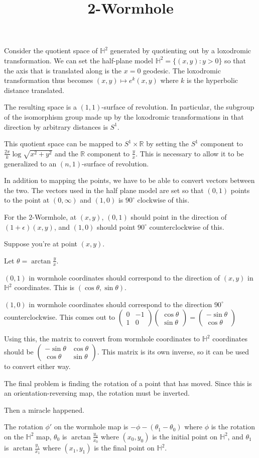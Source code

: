 \documentclass[12pt]{amsart}
\newcommand{\mat}[4]{\left(\begin{array}{ccc} #1 & #2 \\#3 & #4 \end{array} \right)}
\newcommand{\vect}[2]{\left(\begin{array}{ccc} #1 \\#2 \end{array} \right)}
\begin{document}
\title{2-Wormhole}
\maketitle

Consider the quotient space of $\mathbb{H}^2$ generated by quotienting out by a loxodromic transformation. We can set the half-plane model $\mathbb{H}^2 = \{(x,y):y>0\}$ so that the axis that is translated along is the $x=0$ geodesic. The loxodromic transformation thus becomes $(x,y) \mapsto e^k(x,y)$ where $k$ is the hyperbolic distance translated.

The resulting space is a $(1,1)$-surface of revolution. In particular, the subgroup of the isomorphism group made up by the loxodromic transformations in that direction by arbitrary distances is $S^1$.

This quotient space can be mapped to $S^1 \times \mathbb{R}$ by setting the $S^1$ component to $\frac{2\pi}{k}\log\sqrt{x^2+y^2}$ and the $\mathbb{R}$ component to $\frac{y}{x}$. This is necessary to allow it to be generalized to an $(n,1)$-surface of revolution.


In addition to mapping the points, we have to be able to convert vectors between the two. The vectors used in the half plane model are set so that $(0,1)$ points to the point at $(0,\infty)$ and $(1,0)$ is $90^\circ$ clockwise of this.

For the $2$-Wormhole, at $(x,y)$, $(0,1)$ should point in the direction of $(1+\epsilon)(x,y)$, and $(1,0)$ should point $90^\circ$ counterclockwise of this.

Suppose you're at point $(x,y)$.

Let $\theta = \arctan\frac{y}{x}$.

$(0,1)$ in wormhole coordinates should correspond to the direction of $(x,y)$ in $\mathbb{H}^2$ coordinates. This is $(\cos\theta,\sin\theta)$.

$(1,0)$ in wormhole coordinates should correspond to the direction $90^\circ$ counterclockwise. This comes out to $\mat{0}{-1}{1}{0}\vect{\cos\theta}{\sin\theta} = \vect{-\sin\theta}{\cos\theta}$

Using this, the matrix to convert from wormhole coordinates to $\mathbb{H}^2$ coordinates should be $\mat{-\sin\theta}{\cos\theta}{\cos\theta}{\sin\theta}$. This matrix is its own inverse, so it can be used to convert either way.


The final problem is finding the rotation of a point that has moved. Since this is an orientation-reversing map, the rotation must be inverted.

Then a miracle happened.

The rotation $\phi'$ on the wormhole map is $-\phi-(\theta_1-\theta_0)$ where $\phi$ is the rotation on the $\mathbb{H}^2$ map, $\theta_0$ is $\arctan\frac{y_0}{x_0}$ where $(x_0,y_0)$ is the initial point on $\mathbb{H}^2$, and $\theta_1$ is $\arctan\frac{y_1}{x_1}$ where $(x_1,y_1)$ is the final point on $\mathbb{H}^2$.
\end{document}
